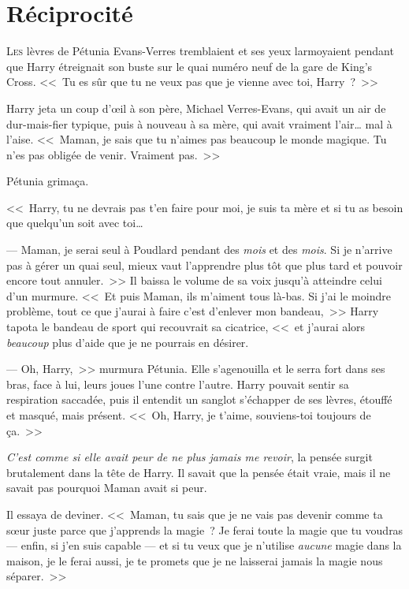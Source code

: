 \chapter{Réciprocité}

\lettrine{L}{es} lèvres de Pétunia Evans-Verres tremblaient et ses yeux larmoyaient pendant que Harry étreignait son buste sur le quai numéro neuf de la gare de King's Cross. <<~Tu es sûr que tu ne veux pas que je vienne avec toi, Harry~?~>>

Harry jeta un coup d'œil à son père, Michael Verres-Evans, qui avait un air de dur-mais-fier typique, puis à nouveau à sa mère, qui avait vraiment l'air… mal à l'aise. <<~Maman, je sais que tu n'aimes pas beaucoup le monde magique. Tu n'es pas obligée de venir. Vraiment pas.~>>

Pétunia grimaça.

<<~Harry, tu ne devrais pas t'en faire pour moi, je suis ta mère et si tu as besoin que quelqu'un soit avec toi…

--- Maman, je serai seul à Poudlard pendant des \emph{mois} et des \emph{mois}. Si je n'arrive pas à gérer un quai seul, mieux vaut l'apprendre plus tôt que plus tard et pouvoir encore tout annuler.~>> Il baissa le volume de sa voix jusqu'à atteindre celui d'un murmure. <<~Et puis Maman, ils m'aiment tous là-bas. Si j'ai le moindre problème, tout ce que j'aurai à faire c'est d'enlever mon bandeau,~>> Harry tapota le bandeau de sport qui recouvrait sa cicatrice, <<~et j'aurai alors \emph{beaucoup} plus d'aide que je ne pourrais en désirer.

--- Oh, Harry,~>> murmura Pétunia. Elle s'agenouilla et le serra fort dans ses bras, face à lui, leurs joues l'une contre l'autre. Harry pouvait sentir sa respiration saccadée, puis il entendit un sanglot s'échapper de ses lèvres, étouffé et masqué, mais présent. <<~Oh, Harry, je t'aime, souviens-toi toujours de ça.~>>

\emph{C'est comme si elle avait peur de ne plus jamais me revoir}, la pensée surgit brutalement dans la tête de Harry. Il savait que la pensée était vraie, mais il ne savait pas pourquoi Maman avait si peur.

Il essaya de deviner. <<~Maman, tu sais que je ne vais pas devenir comme ta sœur juste parce que j'apprends la magie~? Je ferai toute la magie que tu voudras — enfin, si j'en suis capable — et si tu veux que je n'utilise \emph{aucune} magie dans la maison, je le ferai aussi, je te promets que je ne laisserai jamais la magie nous séparer.~>>

